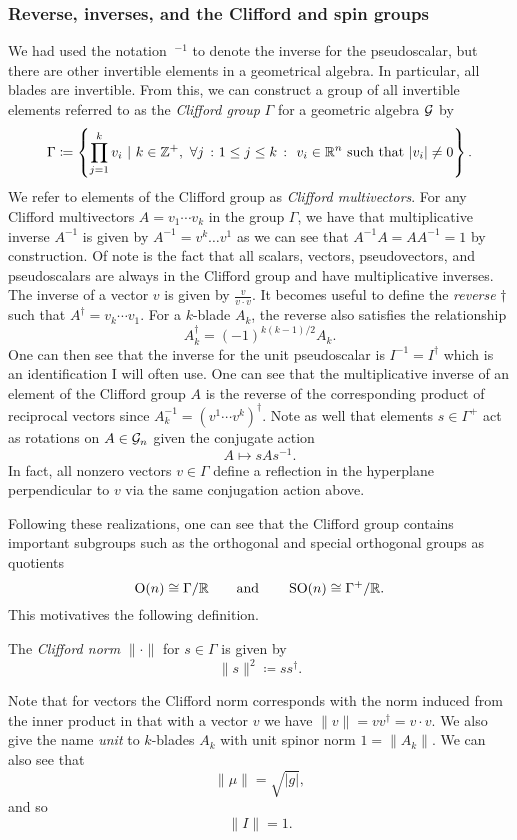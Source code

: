 \subsubsection{Reverse, inverses, and the Clifford and spin groups}

We had used the notation $~^{-1}$ to denote the inverse for the pseudoscalar, but there are other invertible elements in a geometrical algebra.  In particular, all blades are invertible. From this, we can construct a group of all invertible elements referred to as the \emph{Clifford group} $\Gamma$ for a geometric algebra $\mathcal{G}$ by
\[
\Gamma \coloneqq \left\{ \prod_{j=1}^k v_i ~\vert~ k\in \mathbb{Z}^+,~ \forall j~\colon1\leq j \leq k~\colon~v_i \in \mathbb{R}^n ~\textrm{such that}~|v_i|\neq 0\right\}.
\]
We refer to elements of the Clifford group as \emph{Clifford multivectors}. For any Clifford multivectors $A = v_1 \cdots v_k$ in the group $\Gamma$, we have that multiplicative inverse $A^{-1}$ is given by $A^{-1} = v^k \dots v^1$ as we can see that $A^{-1}A=AA^{-1} = 1$ by construction.  Of note is the fact that all scalars, vectors, pseudovectors, and pseudoscalars are always in the Clifford group and have multiplicative inverses. The inverse of a vector $v$ is given by $\frac{v}{v\cdot v}$. It becomes useful to define the \emph{reverse} $\dagger$ such that $A^\dagger = v_k \cdots v_1$. For a $k$-blade $A_k$, the reverse also satisfies the relationship
\begin{equation}
\label{eq:reverse_sign}
A_k^\dagger = (-1)^{k(k-1)/2} A_k.
\end{equation}
One can then see that the inverse for the unit pseudoscalar is $I^{-1}=I^\dagger$ which is an identification I will often use. One can see that the multiplicative inverse of an element of the Clifford group $A$ is the reverse of the corresponding product of reciprocal vectors since $A_k^{-1} = (v^1 \cdots v^k)^\dagger$. Note as well that elements $s \in \Gamma^+$ act as rotations on $A\in \mathcal{G}_n$ given the conjugate action
\[
A \mapsto s A s^{-1}.
\]
In fact, all nonzero vectors $v\in\Gamma$ define a reflection in the hyperplane perpendicular to $v$ via the same conjugation action above.

Following these realizations, one can see that the Clifford group contains important subgroups such as the orthogonal and special orthogonal groups as quotients
\[
\operatorname{O}(n) \cong \Gamma/\mathbb{R} \qquad \textrm{and} \qquad \operatorname{SO}(n) \cong \Gamma^+ /\mathbb{R}.
\]
This motivatives the following definition.
\begin{definition}
    The \emph{Clifford norm} $\| \cdot \|$ for $s \in \Gamma$ is given by
    \[
    \|s\|^2 \coloneqq ss^\dagger.
    \]  
\end{definition}
Note that for vectors the Clifford norm corresponds with the norm induced from the inner product in that with a vector $v$ we have $\|v\|=vv^\dagger = v\cdot v$. We also give the name \emph{unit} to $k$-blades $A_k$ with unit spinor norm $1=\|A_k\|$. We can also see that 
\begin{equation}
\label{eq:pseudoscalar_norm}
\|\mu\| = \sqrt{|g|},
\end{equation}
and so
\[
\|I\| = 1.
\]

